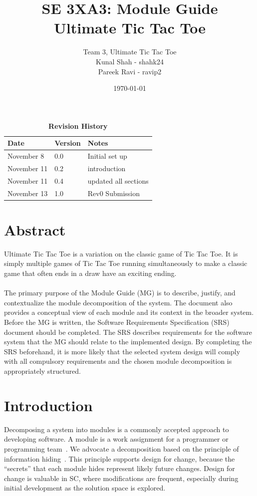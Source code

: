 \documentclass[12pt, titlepage]{article}
\title{SE 3XA3: Module Guide\\Ultimate Tic Tac Toe}
\author{Team 3, Ultimate Tic Tac Toe
		\\ Kunal Shah - shahk24
		\\ Pareek Ravi - ravip2
}
\date{\today}
\begin{document}
\maketitle

\tableofcontents
\listoftables
\listoffigures

\begin{table}[bp]
\caption{\bf Revision History}
\begin{tabularx}{\textwidth}{p{3cm}p{2cm}X}
\toprule {\bf Date} & {\bf Version} & {\bf Notes}\\
\midrule
November 8  & 0.0 & Initial set up\\
November 11 & 0.2 & introduction \\
November 11 & 0.4 & updated all sections \\
November 13 & 1.0 & Rev0 Submission\\
\bottomrule
\end{tabularx}
\end{table}

\newpage


\section*{Abstract}
Ultimate Tic Tac Toe is a variation on the classic game of Tic Tac Toe. It is 
simply multiple games of Tic Tac Toe running simultaneously to make a classic 
game that often ends in a draw have an exciting ending.\\\\
The primary purpose of the Module Guide (MG) is to describe, justify, and
contextualize the module decomposition of the system. The document also provides
a conceptual view of each module and its context in the broader system. Before
the MG is written, the Software Requirements Specification (SRS) document should
be completed. The SRS describes requirements for the software system that the MG
should relate to the implemented design. By completing the SRS beforehand, it
is more likely that the selected system design will comply with all compulsory
requirements and the chosen module decomposition is appropriately structured.

\section{Introduction}

Decomposing a system into modules is a commonly accepted approach to developing
software.  A module is a work assignment for a programmer or programming
team~\citep{ParnasEtAl1984}.  We advocate a decomposition
based on the principle of information hiding~\citep{Parnas1972a}.  This
principle supports design for change, because the ``secrets'' that each module
hides represent likely future changes.  Design for change is valuable in SC,
where modifications are frequent, especially during initial development as the
solution space is explored.  
\end{document}

